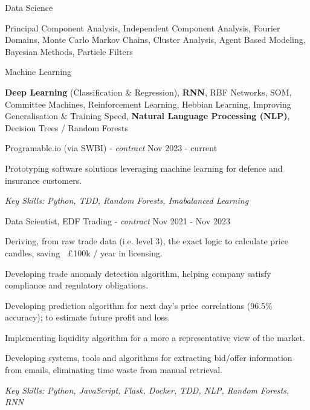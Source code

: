 \documentclass[11pt,article,oneside]{memoir}
\newenvironment{itemize*}{%
  \renewcommand\labelitemi{\textbullet}
  \footnotesize
  \begin{itemize}%
    \setlength{\itemsep}{0pt}}%
  {\end{itemize}
}
\begin{document}
\ind Data Science

\ind \hspace{0.354in} \footnotesize Principal Component Analysis, Independent Component Analysis, Fourier Domains,
Monte Carlo Markov Chains, Cluster Analysis, Agent Based Modeling, Bayesian Methods, Particle Filters \normalsize

\ind Machine Learning 

\ind \hspace{0.354in} \footnotesize \textbf{Deep Learning} (Classification \& Regression), \textbf{RNN}, RBF Networks, SOM, Committee Machines,
Reinforcement Learning, Hebbian Learning, Improving Generalisation \& Training Speed, \textbf{Natural Language Processing (NLP)}, Decision Trees / Random Forests \normalsize

\bigskip
 

\normalsize
\medskip
\ind Programable.io (via SWBI) - \emph{contract} \hfill Nov 2023 - current
\begin{itemize*}
    \item Prototyping software solutions leveraging machine learning for defence and insurance customers.
\end{itemize*}
\ind \hspace{0.35in} \footnotesize \emph{Key Skills: Python, TDD, Random Forests, Imabalanced Learning}

\normalsize
\medskip
\ind Data Scientist, EDF Trading - \emph{contract} \hfill Nov 2021 - Nov 2023
\begin{itemize*}
    \item Deriving, from raw trade data (i.e. level 3), the exact logic to calculate price candles, saving ~£100k / year in licensing.
    \item Developing trade anomaly detection algorithm, helping company satisfy compliance and regulatory obligations.
    \item Developing prediction algorithm for next day's price correlations (96.5\% accuracy); to estimate future profit and loss. 
    \item Implementing liquidity algorithm for a more a representative view of the market.
    \item Developing systems, tools and algorithms for extracting bid/offer information from emails, eliminating time waste from manual retrieval. 
\end{itemize*}
\ind \hspace{0.35in} \footnotesize \emph{Key Skills: Python, JavaScript, Flask, Docker, TDD, NLP, Random Forests, RNN}
\end{document}
